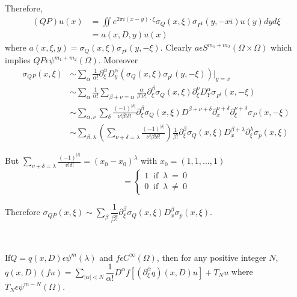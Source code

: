 Therefore,
\begin{align*}
  (QP) u(x)  & = \iint e^{2 \pi i (x-y)\cdot \xi} \sigma_Q (x,  \xi)
    \sigma_{P^t} (y,  -xi) u(y) dy d\xi\\ 
  & = a(x,D,y) u(x)
\end{align*}
where $a (x, \xi,  y) = \sigma_{Q} (x, \xi )\sigma _{P^t} (y, 
-\xi)$. Clearly  $a \epsilon S^{m_1 + m_2} (\Omega  \times \Omega)$
which implies $QP \epsilon \psi^{m_1 + m_2} (\Omega)$. Moreover 
\begin{align*}
  \sigma_{Q P} (x,  \xi) & \sim \sum_\alpha \frac{1}{\alpha!}
  \partial^{\alpha}_{\xi}D^{\alpha}_{y}(\sigma_Q (x,  \xi) \sigma_{p^t} (y,-\xi
  ))|_{y=x}\\ 
  & \sim \sum_{\alpha} \frac{1}{\alpha!} \sum_{\beta + \nu = \alpha }
  \frac{\alpha}{\beta !\nu!} \partial^{\beta}_{\xi} \sigma_{Q}(x, \xi)
  \partial^{\nu}_{\xi} D^{\alpha}_Y \sigma_{P^t}(x,-\xi)\\ 
  & \sim \sum_{\alpha,\nu} \sum_{\delta} \frac{(-1)^{|\delta|}}{\nu !
    \beta ! \delta!}\partial^{\beta}_{\xi}\sigma_{{Q}}(x, \xi)
  D^{\beta+ \nu + \delta} \partial^{\nu + \delta}_{x} \partial^{ \nu +
    \delta}_{\xi}\sigma_{P}(x,-\xi)\\ 
  & \sim \sum_{\beta,  \lambda} \left( \sum_{\nu + \delta =
    \lambda}\frac{(-1)^{|\delta|}}{\nu ! \beta ! \delta!}\right)
  \frac{1}{\beta!}\partial^{\beta}_{\xi}\sigma_{Q}(x, \xi)
  D^{\beta+\lambda}_{x} \partial^{\lambda}_{\xi} \sigma_p(x,\xi) 
\end{align*}

But $\sum \limits _{v+ \delta =\lambda} \frac{(-1)^{|\delta|}}{v!
  \delta !}= (x_0-x_0)^\lambda$ with $x_0=(1,1, \ldots, 1)$ 
\begin{equation*}
  =
  \begin{cases}
    1 ~\text{ if }~ \lambda ~ = ~ 0 \\ 
    0 ~\text{ if } ~\lambda ~\neq ~ 0
  \end{cases}
\end{equation*}

Therefore $\sigma _{QP}(x, \xi) \sim \sum\limits_\beta
\dfrac{1}{\beta !} \partial^{\beta}_{\xi} \sigma_Q (x,
\xi)D^\beta_x \sigma_p (x, \xi)$. 

\setcounter{coro}{36}
\begin{coro}\label{chap4:sec6:coro4.37}
~  

If\pageoriginale  $Q= q (x,D) \epsilon \psi
  ^m (\lambda)$ and $f \epsilon C^\infty (\Omega)$, then for any
  positive integer $N$, $q(x,D)(fu)= \sum \limits _{|\alpha|<N}
  \dfrac{1}{\alpha !} D^ \alpha f [(\partial ^\alpha_\xi
    q)(x,D)u]+T_Nu$ where $T_N \epsilon \psi^{m-N}(\Omega)$. 
\end{coro}

